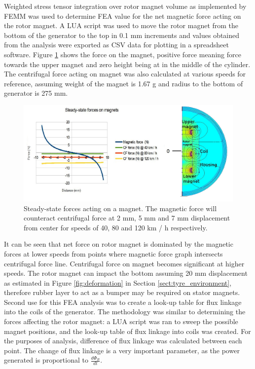 Weighted stress tensor integration over rotor magnet volume as implemented by FEMM was used to determine FEA value for the net magnetic force acting on the rotor magnet. A LUA script was used to move the rotor magnet from the bottom of the generator to the top in 0.1 mm increments and values obtained from the analysis were exported as CSV data for plotting in a spreadsheet software. Figure \ref{femm_forces} shows the force on the magnet, positive force meaning force towards the upper magnet and zero height being at in the middle of the cylinder. The centrifugal force acting on magnet was also calculated at various speeds for reference, assuming weight of the magnet is 1.67 g and radius to the bottom of generator is 275 mm.

\begin{figure}[htb]
  \begin{center}
  \includegraphics[width=\columnwidth]{images/own_dwg/femm_fvsd_dualmagnet.jpg}
  \end{center}
  \caption{\label{femm_forces} Steady-state forces acting on a magnet. The magnetic force will counteract centrifugal force at 2 mm, 5 mm and 7 mm displacement from center for speeds of 40, 80 and 120 km / h respectively.}
\end{figure}

It can be seen that net force on rotor magnet is dominated by the magnetic forces at lower speeds from points where magnetic force graph intersects centrifugal force line. Centrifugal force on magnet becomes significant at higher speeds. The rotor magnet can impact the bottom assuming 20 mm displacement as estimated in Figure \ref{fig:deformation} in Section \ref{sect:tyre_environment}, therefore rubber layer to act as a bumper may be required on stator magnets. Second use for this FEA analysis was to create a look-up table for flux linkage into the coils of the generator. The methodology was similar to determining the forces affecting the rotor magnet: a LUA script was ran to sweep the possible magnet positions, and the look-up table of flux linkage into coils was created. For the purposes of analysis, difference of flux linkage was calculated between each point. The change of flux linkage is a very important parameter, as the power generated is proportional to $\frac{d \Phi_{B}}{d t}$. 

